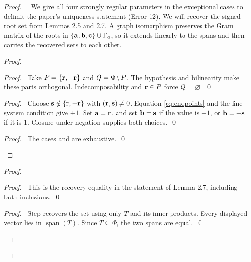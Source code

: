 \begin{proof}
 \pfsketch\ \repair\ We give all four strongly regular parameters in the exceptional
 cases to delimit the paper's uniqueness statement (Error 12). We will recover the signed root set
 from Lemmas 2.5 and 2.7.
 A graph isomorphism preserves the Gram matrix of the roots in
 $\{{\mathbf a},{\mathbf b},{\mathbf c}\}\cup\Gamma_a$, so it extends linearly to the spans and then carries
 the recovered sets to each other.

 \begin{proof}
  \begin{proof}
   \pf\ Take $P=\{{\mathbf r},-{\mathbf r}\}$ and $Q=\Phi\mathbin{\mkern-1.5mu\setminus\mkern-1.5mu} P$.
   The hypothesis and bilinearity make these parts orthogonal.
   Indecomposability and ${\mathbf r}\in P$ force $Q=\varnothing$.~\qed
  \end{proof}
  \begin{proof}
   \pf\ Choose ${\mathbf s}\notin\{{\mathbf r},-{\mathbf r}\}$ with $({\mathbf r},{\mathbf s})\ne0$.
   Equation \eqref{eq:endpoints} and the line-system condition give $\pm1$.
   Set ${\mathbf a}={\mathbf r}$, and set ${\mathbf b}={\mathbf s}$ if the value is $-1$, or ${\mathbf b}=-{\mathbf s}$ if it is 1.
   Closure under negation supplies both choices.~\qed
  \end{proof}
  \qedstep
  \begin{proof}\pf\ The cases  and  are exhaustive.~\qed\end{proof}
 \end{proof}

 \begin{proof}
  \begin{proof}\pf\ This is the recovery equality in the statement of Lemma 2.7,
   including both inclusions.~\qed\end{proof}
  \qedstep
  \begin{proof}
   \pf\ Step  recovers the set using only $T$ and its inner products.
   Every displayed vector lies in $\operatorname{span}(T)$.
   Since $T\subseteq\Phi$, the two spans are equal.~\qed
  \end{proof}
 \end{proof}


\end{proof}
